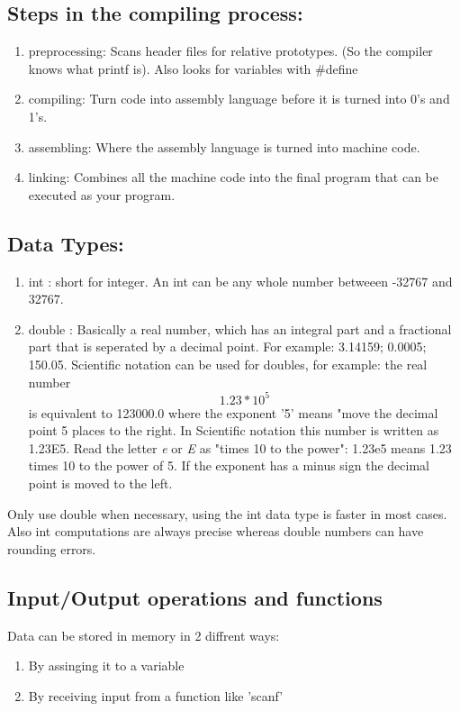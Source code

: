 \documentclass[12pt, letterpaper]{report}
\begin{document}
\subsection{Steps in the compiling process:}

\begin{enumerate}
	\item preprocessing: Scans header files for relative prototypes. (So the compiler knows what printf is). Also looks for variables with \#define
	\item compiling: Turn code into assembly language before it is turned into 0's and 1's.
	\item assembling: Where the assembly language is turned into machine code.
	\item linking: Combines all the machine code into the final program that can be executed as your program.
\end{enumerate}

\subsection{Data Types:}
\begin{enumerate}
	\item int : short for integer. An int can be any whole number betweeen 
		-32767 and 32767.
	\item double : Basically a real number, which has an integral part and a 
		fractional part that is seperated by a decimal point. For example: 
		3.14159; 0.0005; 150.05. Scientific notation can be used for doubles,
		for example: the real number \[ 1.23 * 10^5 \] is equivalent to 123000.0
		where the exponent '5' means "move the decimal point 5 places to the right.
		In Scientific notation this number is written as 1.23E5. Read the letter 
		\textit{e} or \textit{E} as "times 10 to the power": 1.23e5 means 1.23 times
		10 to the power of 5. If the exponent has a minus sign the decimal point is
		moved to the left.
\end{enumerate}
Only use double when necessary, using the int data type is faster in most cases. Also
int computations are always precise whereas double numbers can have rounding 
errors.

\subsection{Input/Output operations and functions}
Data can be stored in memory in 2 diffrent ways:
\begin{enumerate}
	\item By assinging it to a variable
	\item By receiving input from a function like 'scanf'
\end{enumerate}
\end{document}
